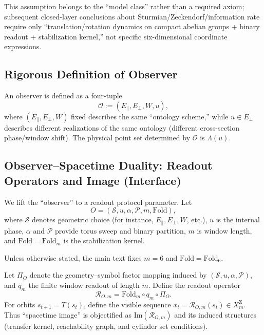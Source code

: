 \begin{remark}
This assumption belongs to the ``model class'' rather than a required axiom; subsequent closed-layer conclusions about Sturmian/Zeckendorf/information rate require only ``translation/rotation dynamics on compact abelian groups + binary readout + stabilization kernel,'' not specific six-dimensional coordinate expressions.
\end{remark}

\subsection{Rigorous Definition of Observer}

\begin{definition}\label{def:observer}
An observer is defined as a four-tuple
\[
\mathcal{O}:=(E_{\parallel},E_{\perp},W,u),
\]
where $(E_{\parallel},E_{\perp},W)$ fixed describes the same ``ontology scheme,'' while $u\in E_{\perp}$ describes different realizations of the same ontology (different cross-section phase/window shift). The physical point set determined by $\mathcal{O}$ is $\Lambda(u)$.
\end{definition}

\subsection{Observer--Spacetime Duality: Readout Operators and Image (Interface)}

We lift the ``observer'' to a readout protocol parameter. Let
$$
O=(\mathcal{S},u,\alpha,\mathcal{P},m,\mathrm{Fold}),
$$
where $\mathcal{S}$ denotes geometric choice (for instance, $E_{\parallel},E_{\perp},W$, etc.), $u$ is the internal phase, $\alpha$ and $\mathcal{P}$ provide torus sweep and binary partition, $m$ is window length, and $\mathrm{Fold}=\mathrm{Fold}_m$ is the stabilization kernel.

\begin{assumption}\label{assump:m6-fixed-main-chain}
Unless otherwise stated, the main text fixes $m=6$ and $\mathrm{Fold}=\mathrm{Fold}_6$.
\end{assumption}

Let $\Pi_O$ denote the geometry--symbol factor mapping induced by $(\mathcal{S},u,\alpha,\mathcal{P})$, and $q_m$ the finite window readout of length $m$. Define the readout operator
$$
\mathcal{R}_{O,m}=\mathrm{Fold}_m\circ q_m\circ \Pi_O.
$$
For orbits $s_{t+1}=T(s_t)$, define the visible sequence $x_t=\mathcal{R}_{O,m}(s_t)\in X_m^{\mathrm Z}$. Thus ``spacetime image'' is objectified as $\mathrm{Im}(\mathcal{R}_{O,m})$ and its induced structures (transfer kernel, reachability graph, and cylinder set conditions).

